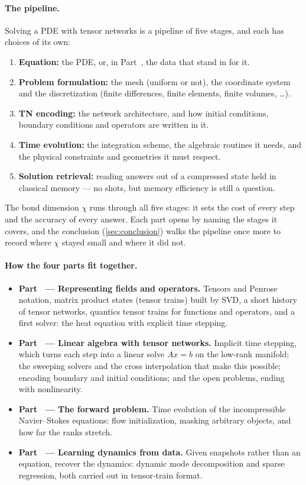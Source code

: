 \documentclass[english,course]{lecturenotes}
\begin{document}
\paragraph{The pipeline.}
Solving a PDE with tensor networks is a pipeline of five stages, and each has
choices of its own:
\begin{enumerate}
  \item \textbf{Equation:} the PDE, or, in Part~, the data that stand
    in for it.
  \item \textbf{Problem formulation:} the mesh (uniform or not), the coordinate
    system and the discretization (finite differences, finite elements,
    finite volumes, \ldots).
  \item \textbf{TN encoding:} the network architecture, and how initial
    conditions, boundary conditions and operators are written in it.
  \item \textbf{Time evolution:} the integration scheme, the algebraic routines
    it needs, and the physical constraints and geometries it must respect.
  \item \textbf{Solution retrieval:} reading answers out of a compressed state
    held in classical memory --- no shots, but memory efficiency is still a
    question.
\end{enumerate}
The bond dimension $\chi$ runs through all five stages: it sets the cost of
every step and the accuracy of every answer. Each part opens by naming the
stages it covers, and the conclusion (\cref{sec:conclusion}) walks the pipeline
once more to record where $\chi$ stayed small and where it did not.

\paragraph{How the four parts fit together.}
\begin{itemize}
  \item \textbf{Part~ --- Representing fields and operators.}
    Tensors and Penrose notation, matrix product states (tensor trains) built
    by SVD, a short history of tensor networks, quantics tensor trains for
    functions and operators, and a first solver: the heat equation with
    explicit time stepping.
  \item \textbf{Part~ --- Linear algebra with tensor networks.}
    Implicit time stepping, which turns each step into a linear solve $Ax=b$
    on the low-rank manifold; the sweeping solvers and the cross interpolation
    that make this possible; encoding boundary and initial conditions; and the
    open problems, ending with nonlinearity.
  \item \textbf{Part~ --- The forward problem.} Time evolution of the
    incompressible Navier--Stokes equations: flow initialization, masking
    arbitrary objects, and how far the ranks stretch.
  \item \textbf{Part~ --- Learning dynamics from data.} Given
    snapshots rather than an equation, recover the dynamics: dynamic mode
    decomposition and sparse regression, both carried out in tensor-train
    format.
\end{itemize}
\end{document}
